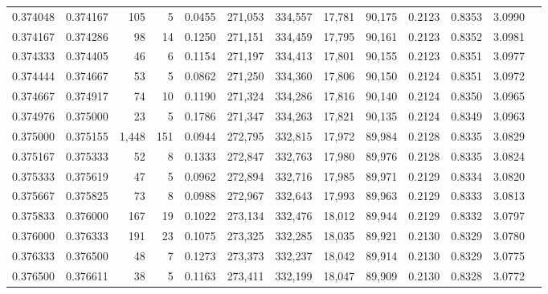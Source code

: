 \begin{tabular}{rrrrrrrrrrrrr}
0.374048 & 0.374167 &   105 &   5 &                                     0.0455 & 271,053 & 334,557 &  17,781 &  90,175 & 0.2123 & 0.8353 & 3.0990 \\
0.374167 & 0.374286 &    98 &  14 &                                     0.1250 & 271,151 & 334,459 &  17,795 &  90,161 & 0.2123 & 0.8352 & 3.0981 \\
0.374333 & 0.374405 &    46 &   6 &                                     0.1154 & 271,197 & 334,413 &  17,801 &  90,155 & 0.2123 & 0.8351 & 3.0977 \\
0.374444 & 0.374667 &    53 &   5 &                                     0.0862 & 271,250 & 334,360 &  17,806 &  90,150 & 0.2124 & 0.8351 & 3.0972 \\
0.374667 & 0.374917 &    74 &  10 &                                     0.1190 & 271,324 & 334,286 &  17,816 &  90,140 & 0.2124 & 0.8350 & 3.0965 \\
0.374976 & 0.375000 &    23 &   5 &                                     0.1786 & 271,347 & 334,263 &  17,821 &  90,135 & 0.2124 & 0.8349 & 3.0963 \\
0.375000 & 0.375155 & 1,448 & 151 &                                     0.0944 & 272,795 & 332,815 &  17,972 &  89,984 & 0.2128 & 0.8335 & 3.0829 \\
0.375167 & 0.375333 &    52 &   8 &                                     0.1333 & 272,847 & 332,763 &  17,980 &  89,976 & 0.2128 & 0.8335 & 3.0824 \\
0.375333 & 0.375619 &    47 &   5 &                                     0.0962 & 272,894 & 332,716 &  17,985 &  89,971 & 0.2129 & 0.8334 & 3.0820 \\
0.375667 & 0.375825 &    73 &   8 &                                     0.0988 & 272,967 & 332,643 &  17,993 &  89,963 & 0.2129 & 0.8333 & 3.0813 \\
0.375833 & 0.376000 &   167 &  19 &                                     0.1022 & 273,134 & 332,476 &  18,012 &  89,944 & 0.2129 & 0.8332 & 3.0797 \\
0.376000 & 0.376333 &   191 &  23 &                                     0.1075 & 273,325 & 332,285 &  18,035 &  89,921 & 0.2130 & 0.8329 & 3.0780 \\
0.376333 & 0.376500 &    48 &   7 &                                     0.1273 & 273,373 & 332,237 &  18,042 &  89,914 & 0.2130 & 0.8329 & 3.0775 \\
0.376500 & 0.376611 &    38 &   5 &                                     0.1163 & 273,411 & 332,199 &  18,047 &  89,909 & 0.2130 & 0.8328 & 3.0772 \\

\end{tabular}
